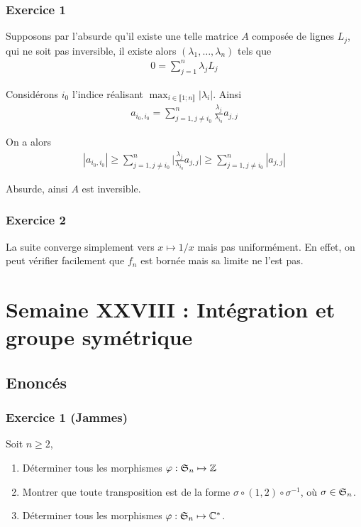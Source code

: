 \documentclass{article}
\begin{document}
\subsubsection*{Exercice 1}
Supposons par l'absurde qu'il existe une telle matrice  $A$ composée de lignes $L_j$, qui ne soit pas inversible, il existe alors $(\lambda_1,\ldots, \lambda_n)$ tels que 
\begin{align*}
0 = \sum_{j=1}^n \lambda_j L_j
\end{align*}

Considérons $i_0$ l'indice réalisant $\max_{i\in\llbracket 1;n\rrbracket} |\lambda_i|$. Ainsi
\begin{align*}
a_{i_0,i_0}= \sum_{j=1,j\neq i_0}^n \frac{\lambda_j}{\lambda_{i_0}}a_{j,j}
\end{align*}

On a alors
\begin{align*}
|a_{i_0,i_0}| \geq \sum_{j=1,j\neq i_0}^n \bigg|\frac{\lambda_j}{\lambda_{i_0}} a_{j,j}\bigg|\geq \sum_{j=1,j\neq i_0}^n |a_{j,j}|
\end{align*}

Absurde, ainsi $A$ est inversible.
\subsubsection*{Exercice 2}
La suite converge simplement vers $x \mapsto 1/x$ mais pas uniformément. En effet, on peut vérifier facilement que $f_n$ est bornée mais sa limite ne l'est pas. 
\section{Semaine XXVIII : Intégration et groupe symétrique}
\subsection*{Enoncés}
\subsubsection*{Exercice 1 (Jammes)}
Soit $n\geq 2$,
\begin{enumerate}
\item Déterminer tous les morphismes $\varphi : \frak{S}_n \mapsto \mathbb{Z}$
\item Montrer que toute transposition est de la forme $\sigma \circ (1, 2) \circ \sigma^{-1}$, où $\sigma\in\frak{S}_n$.
\item Déterminer tous les morphismes $\varphi : \frak{S}_n \mapsto \mathbb{C}^*$.
\end{enumerate}
\end{document}
